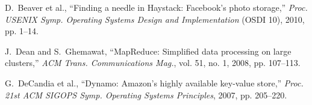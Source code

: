 

% 
% 

    

\begin{thebibliography}{1}



D.~Beaver et al., ``Finding a needle in Haystack: Facebook’s photo storage,'' \emph{Proc. USENIX Symp. Operating Systems Design and Implementation} (OSDI 10), 2010, pp. 1--14.

J.~Dean and S.~Ghemawat, ``{MapReduce}: {Simplified} data processing on large clusters,'' \emph{ACM Trans. Communications Mag.}, vol. 51, no. 1, 2008, pp. 107--113.

G.~DeCandia et al., ``Dynamo: Amazon's highly available key-value store,'' \emph{Proc. 21st ACM SIGOPS Symp. Operating Systems Principles}, 2007, pp. 205--220.



\end{thebibliography}
    